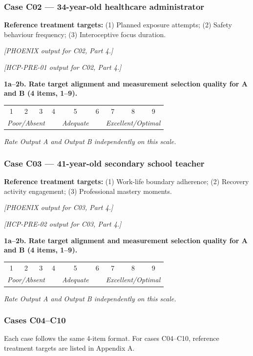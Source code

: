 \documentclass[11pt,a4paper]{article}
\makeatletter
\newcommand{\likertscale}[1]{%
\par\vspace{0.15em}%
\noindent\begin{tcolorbox}[colback=ScaleBG,colframe=BorderGrey,boxrule=0.4pt,arc=1mm,left=5pt,right=5pt,top=4pt,bottom=4pt]%
\small\textbf{\color{SlateMid}#1}\\[0.25em]%
\begin{tabular}{@{}*{9}{c}@{}}%
1 & 2 & 3 & 4 & 5 & 6 & 7 & 8 & 9 \\%
\multicolumn{3}{l}{\tiny\itshape Poor/Absent} & & \multicolumn{1}{c}{\tiny\itshape Adequate} & & \multicolumn{3}{r}{\tiny\itshape Excellent/Optimal}%
\end{tabular}%
\quad\textit{Rate Output A and Output B independently on this scale.}%
\end{tcolorbox}\vspace{0.1em}}
\makeatother
\begin{document}
\vspace{0.4em}

\subsubsection*{Case C02 --- 34-year-old healthcare administrator}
\begin{vignettebox}
\small\textbf{Reference treatment targets:} (1) Planned exposure attempts; (2) Safety behaviour frequency; (3) Interoceptive focus duration.
\end{vignettebox}
\begin{outputAbox}\small\textit{[PHOENIX output for C02, Part 4.]}\end{outputAbox}
\begin{outputBbox}\small\textit{[HCP-PRE-01 output for C02, Part 4.]}\end{outputBbox}
\begin{ratingbox}
\likertscale{1a--2b. Rate \textbf{target alignment} and \textbf{measurement selection quality} for A and B (4 items, 1--9).}
\end{ratingbox}

\vspace{0.4em}

\subsubsection*{Case C03 --- 41-year-old secondary school teacher}
\begin{vignettebox}
\small\textbf{Reference treatment targets:} (1) Work-life boundary adherence; (2) Recovery activity engagement; (3) Professional mastery moments.
\end{vignettebox}
\begin{outputAbox}\small\textit{[PHOENIX output for C03, Part 4.]}\end{outputAbox}
\begin{outputBbox}\small\textit{[HCP-PRE-02 output for C03, Part 4.]}\end{outputBbox}
\begin{ratingbox}
\likertscale{1a--2b. Rate \textbf{target alignment} and \textbf{measurement selection quality} for A and B (4 items, 1--9).}
\end{ratingbox}

\vspace{0.4em}

\subsubsection*{Cases C04--C10}
\begin{instrbox}
\small Each case follows the same 4-item format. For cases C04--C10, reference treatment targets are listed in Appendix A.
\end{instrbox}
\end{document}
